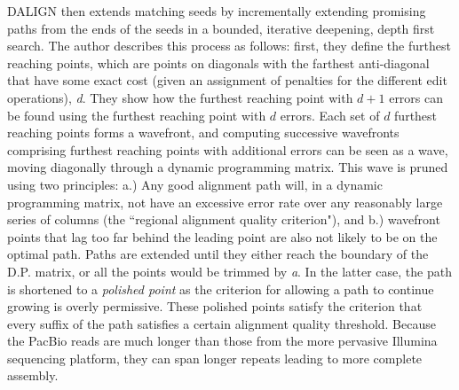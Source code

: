 \documentclass[doctor]{thesis}
\begin{document}
DALIGN then extends matching seeds by incrementally extending promising paths from the ends of the seeds in a bounded, iterative deepening, depth first search.
The author describes this process as follows: first, they define the furthest reaching points, which are points on diagonals with the farthest anti-diagonal that have some exact cost (given an assignment of penalties for the different edit operations), \emph{d}.
They show how the furthest reaching point with  $d+1$ errors can be found using the furthest reaching point with $d$ errors.
Each set of $d$ furthest reaching points forms a wavefront, and computing successive wavefronts comprising furthest reaching points with additional errors can be seen as a wave, moving diagonally through a dynamic programming matrix.
This wave is pruned using two principles: a.) Any good alignment path will, in a dynamic programming matrix,  not have an excessive error rate over any reasonably large series of columns (the ``regional alignment quality criterion"), and b.) wavefront points that lag too far behind the leading point are also not likely to be on the optimal path.
Paths are extended until they either reach the boundary of the D.P. matrix, or all the points would be trimmed by \emph{a}.
In the latter case, the path is shortened to a \emph{polished point} as the criterion for allowing a path to continue growing is overly permissive.
These polished points satisfy the criterion that every suffix of the path satisfies a certain alignment quality threshold.  
Because the PacBio reads are much longer than those from the more pervasive Illumina sequencing platform, they can span longer repeats leading to more complete assembly.



\end{document}
